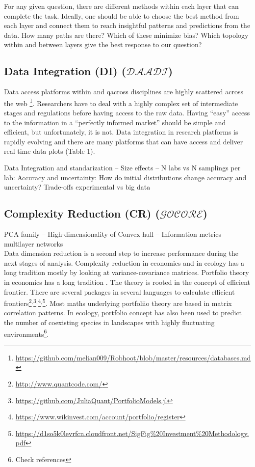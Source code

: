 \documentclass[english,12pt]{article}
\begin{document}
For any given question, there are different
methods within each layer that can complete the task. Ideally, one
should be able to choose the best method from each layer and connect
them to reach insightful patterns and predictions from the data. How
many paths are there? Which of these minimize bias? Which topology
within and between layers give the best response to our question?


\subsection{Data Integration (DI) ($\mathcal{DAADI}$)}

Data access platforms within and qacross disciplines are highly
scattered across the web
\footnote{\url{https://github.com/melian009/Robhoot/blob/master/resources/databases.md}}. Researchers
have to deal with a highly complex set of intermediate stages and
regulations before having access to the raw data. Having ``easy''
access to the information in a ``perfectly informed market'' should be
simple and efficient, but unfortunately, it is not. Data integration
in research platforms is rapidly evolving and there are many platforms
that can have access and deliver real time data plots (Table 1).

Data Integration and standarization -- Size effects -- N labs vs N
samplings per lab: Accuracy and uncertainty: How do initial
distributions change accuracy and uncertainty? Trade-offs experimental
vs big data



\subsection{Complexity Reduction (CR) ($\mathcal{GOCORE}$)}

PCA family -- High-dimensionality of Convex hull -- Information metrics multilayer networks\\


Data dimension reduction is a second step to increase performance
during the next stages of analysis.  Complexity reduction in economics
and in ecology has a long tradition mostly by looking at
variance-covariance matrices.  Portfolio theory in economics has a
long tradition \citep{MarkowitzBook}. The theory is rooted in the
concept of efficient frontier. There are
several packages in several languages to calculate efficient
frontiers\footnote{\url{http://www.quantcode.com/}}$^{,}$\footnote{\url{https://github.com/JuliaQuant/PortfolioModels.jl}}$^{,}$\footnote{\url{https://www.wikinvest.com/account/portfolio/register}}$^{,}$\footnote{\url{https://d1so5k0levrfcn.cloudfront.net/SigFig\%20Investment\%20Methodology.pdf}}. Most
maths underlying portfoliio theory are based
in matrix correlation patterns. In
ecology, portfolio concept has also been used to predict the number of
coexisting species in landscapes with highly fluctuating
environments\footnote{Check references}.
\end{document}
